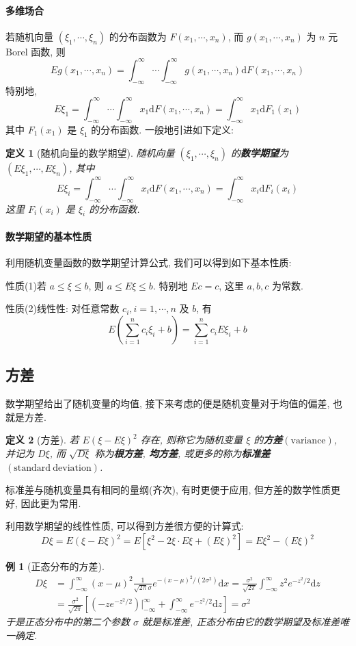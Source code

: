 \documentclass[12pt,a4paper]{article}
\newtheorem{definition}{定义}[subsection] %
\newtheorem{example}{例}[subsection] %
\begin{document}
\paragraph{多维场合}
若随机向量 $(\xi_1, \cdots, \xi_n)$ 的分布函数为 $F(x_1, \cdots, x_n)$, 而 $g(x_1, \cdots, x_n)$ 为 $n$ 元 $\mathrm{Borel}$ 函数, 则 
\[Eg(x_1, \cdots, x_n) = \int_{-\infty}^{\infty} \cdots \int_{-\infty}^{\infty} g(x_1, \cdots, x_n) \mathrm{d} F(x_1, \cdots, x_n)\]
特别地, \[ E\xi_1 = \int_{-\infty}^{\infty} \cdots \int_{-\infty}^{\infty} x_1 \mathrm{d}F(x_1, \cdots, x_n) = \int_{-\infty}^{\infty} x_1 \mathrm{d}F_1(x_1)\]
其中 $F_1(x_1)$ 是 $\xi_1$ 的分布函数. 一般地引进如下定义:
\begin{definition}[随机向量的数学期望]
    随机向量 $(\xi_1, \cdots, \xi_n)$ 的\textbf{数学期望}为 $(E\xi_1, \cdots, E\xi_n)$, 其中
    \[ E\xi_i = \int_{-\infty}^{\infty} \cdots \int_{-\infty}^{\infty} x_i \mathrm{d}F(x_1, \cdots, x_n) = \int_{-\infty}^{\infty} x_i \mathrm{d}F_i(x_i)\]
    这里 $F_i(x_i)$ 是 $\xi_i$ 的分布函数.
\end{definition}

\paragraph{数学期望的基本性质}
利用随机变量函数的数学期望计算公式, 我们可以得到如下基本性质:

性质(1)\quad 若 $a \leq \xi \leq b$, 则 $a \leq E\xi \leq b$. 特别地 $Ec = c$, 这里 $a,b,c$ 为常数.

性质(2)\quad 线性性: 对任意常数 $c_i,i = 1,\cdots,n$ 及 $b$, 有 \[E(\sum\limits_{i=1}^{n}c_i \xi_i + b) = \sum\limits_{i=1}^{n}c_i E\xi_i + b\]

\subsection{方差}
数学期望给出了随机变量的均值, 接下来考虑的便是随机变量对于均值的偏差, 也就是方差.
\begin{definition}[方差]
    若 $E(\xi - E\xi)^2$ 存在, 则称它为随机变量 $\xi$ 的\textbf{方差}$(\mathrm{variance})$, 并记为 $D\xi$, 
    而 $\sqrt{D\xi}$ 称为\textbf{根方差}, \textbf{均方差}, 或更多的称为\textbf{标准差}$(\mathrm{standard \ deviation})$.
\end{definition}
标准差与随机变量具有相同的量纲(齐次), 有时更便于应用, 但方差的数学性质更好, 因此更为常用.

利用数学期望的线性性质, 可以得到方差很方便的计算式: \[ D\xi  = E(\xi - E\xi)^2 = E[\xi^2 - 2\xi \cdot E\xi + (E\xi)^2] = E\xi^2 -(E\xi)^2 \]
\begin{example}[正态分布的方差]
    \[  \begin{aligned}
        D\xi & = \int_{-\infty}^{\infty} (x-\mu)^2 \frac{1}{\sqrt{2\pi}\sigma}e^{-(x-\mu)^2/(2\sigma^2)}\mathrm{d}x = \frac{\sigma^2}{\sqrt{2\pi}}\int_{-\infty}^{\infty}z^2 e^{-z^2/2}\mathrm{d}z\\
        & = \frac{\sigma^2}{\sqrt{2\pi}}\left[ (-ze^{-z^2/2}) \Big|^{\infty}_{-\infty} + \int_{-\infty}^{\infty}e^{-z^2/2} \mathrm{d} z \right] = \sigma^2
    \end{aligned}  \]
    于是正态分布中的第二个参数 $\sigma$ 就是标准差, 正态分布由它的数学期望及标准差唯一确定.
\end{example}
\end{document}
